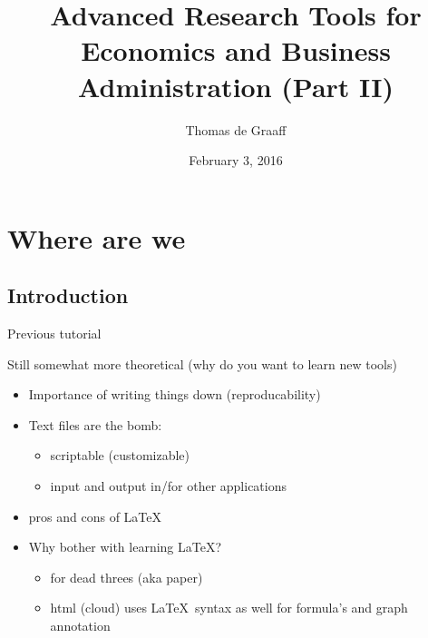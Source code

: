 \documentclass[ignorenonframetext,]{beamer}
\title{Advanced Research Tools for Economics and Business Administration (Part
II)}
\author{Thomas de Graaff}
\date{February 3, 2016}
\begin{document}
\frame{\titlepage}

\section{Where are we}\label{where-are-we}
\subsection{Introduction}
\begin{frame}{Previous tutorial}

Still somewhat more theoretical (why do you want to learn new tools)

\begin{itemize}
\item
  Importance of writing things down (reproducability)
\item
  Text files are the bomb:

  \begin{itemize}
  \itemsep1pt\parskip0pt
  \item
    scriptable (customizable)
  \item
    input and output in/for other applications
  \end{itemize}
\item
  pros and cons of \LaTeX
\item
  Why bother with learning \LaTeX?

  \begin{itemize}
  \itemsep1pt\parskip0pt
  \item
    for dead threes (aka paper)
  \item
    html (cloud) uses \LaTeX~syntax as well for formula's and graph
    annotation
  \end{itemize}
\end{itemize}

\end{frame}
\end{document}
